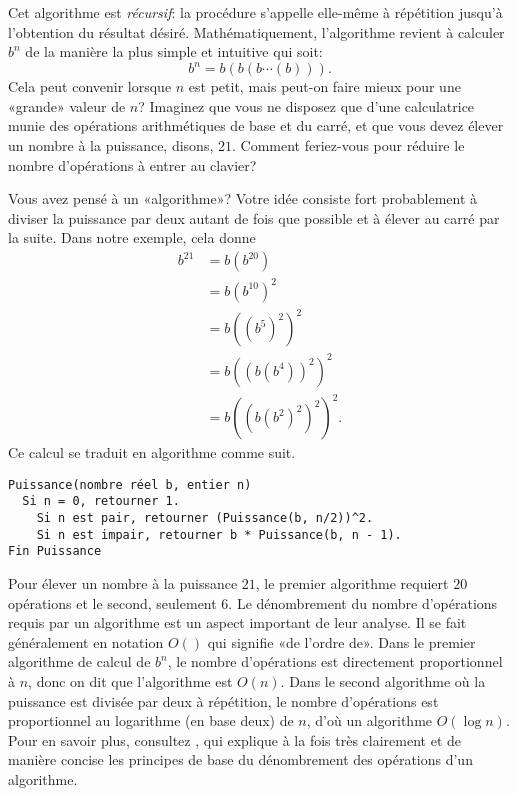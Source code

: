 Cet algorithme est \emph{récursif}: la
procédure  s'appelle elle-même à répétition jusqu'à
l'obtention du résultat désiré. Mathématiquement, l'algorithme revient
à calculer $b^n$ de la manière la plus simple et intuitive qui soit:
\begin{equation*}
  b^n = b (b (b \cdots (b))).
\end{equation*}
Cela peut convenir lorsque $n$ est petit, mais peut-on faire mieux
pour une «grande» valeur de $n$? Imaginez que vous ne disposez que
d'une calculatrice munie des opérations arithmétiques de base et du
carré, et que vous devez élever un nombre à la puissance, disons,
$21$. Comment feriez-vous pour réduire le nombre d'opérations à entrer
au clavier?


Vous avez pensé à un «algorithme»? Votre idée consiste fort
probablement à diviser la puissance par deux autant de fois que
possible et à élever au carré par la suite. Dans notre exemple, cela
donne
\begin{align*}
  b^{21}
  &= b (b^{20}) \\
  & = b (b^{10})^2 \\
  &= b ((b^5)^2)^2 \\
  & = b ((b (b^4))^2)^2 \\
  &= b ((b (b^2)^2)^2)^2.
\end{align*}
Ce calcul se traduit en algorithme comme suit.

\begin{Schunk}
\begin{Verbatim}
Puissance(nombre réel b, entier n)
  Si n = 0, retourner 1.
    Si n est pair, retourner (Puissance(b, n/2))^2.
    Si n est impair, retourner b * Puissance(b, n - 1).
Fin Puissance
\end{Verbatim}
\end{Schunk}

Pour élever un nombre à la puissance $21$, le premier algorithme
requiert $20$ opérations et le second, seulement $6$. Le dénombrement
du nombre d'opérations requis par un algorithme est un aspect
important de leur analyse. Il se fait généralement en notation $O()$
qui signifie «de l'ordre de». Dans le premier algorithme de calcul de
$b^n$, le nombre d'opérations est directement proportionnel à $n$,
donc on dit que l'algorithme est $O(n)$. Dans le second algorithme où
la puissance est divisée par deux à répétition, le nombre d'opérations
est proportionnel au logarithme (en base deux) de $n$, d'où un
algorithme $O(\log n)$. Pour en savoir plus, consultez
\citet[chapitre~1]{Stephens:algorithms:2013}, qui explique à la fois
très clairement et de manière concise les principes de base du
dénombrement des opérations d'un algorithme.

